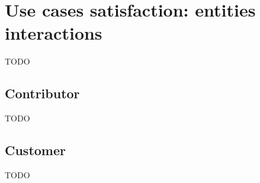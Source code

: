 \section{Use cases satisfaction: entities interactions}\label{use_cases_satisfaction}
TODO

\subsection{Contributor}
TODO

\subsection{Customer}
TODO